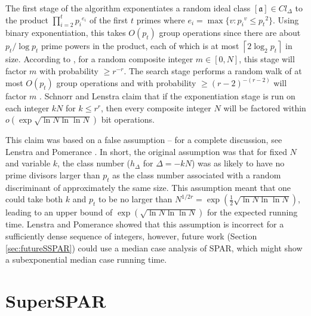\documentclass{ucalgthes1}
\theoremstyle{definition}
\newcommand{\ceil}[1]{\left\lceil #1 \right\rceil}
\newcommand{\ideal}{\mathfrak}
\newcommand{\idealclass}[1]{\left[ \ideal #1 \right]}
\newcommand{\aclass}{\idealclass a}
\begin{document}
The first stage of the algorithm exponentiates a random ideal class $\aclass \in Cl_\Delta$ to the product $\prod_{i=2}^t {p_i}^{e_i}$ of the first $t$ primes where $e_i = \max \{ v : {p_i}^v \le {p_t}^2 \}$.  Using binary exponentiation, this takes $O(p_t)$ group operations since there are about $p_t / \log p_t$ prime powers in the product, each of which is at most $\ceil{2 \log_2 p_t}$ in size. According to \cite[p.290]{Schnorr1984}, for a random composite integer $m \in [0, N]$, this stage will factor $m$ with probability $\ge r^{-r}$.  The search stage performs a random walk of at most $O(p_t)$ group operations and with probability $\ge (r-2)^{-(r-2)}$ will factor $m$ \cite[p.290]{Schnorr1984}.  Schnorr and Lenstra \cite[p.290]{Schnorr1984} claim that if the exponentiation stage is run on each integer $kN$ for $k \le r^r$, then every composite integer $N$ will be factored within $o\left(\exp \sqrt{ \ln N \ln\ln N } \right)$ bit operations.

This claim was based on a false assumption -- for a complete discussion, see Lenstra and Pomerance \cite[\S~11]{Lenstra1992}.  In short, the original assumption was that for fixed $N$ and variable $k$, the class number ($h_\Delta$ for $\Delta = -kN$) was as likely to have no prime divisors larger than $p_t$ as the class number associated with a random discriminant of approximately the same size.  This assumption meant that one could take both $k$ and $p_t$ to be no larger than $N^{1/2r} = \exp\left(\frac{1}{2}\sqrt{\ln N \ln \ln N}\right)$, leading to an upper bound of $\exp\left(\sqrt{\ln N \ln \ln N}\right)$ for the expected running time.  Lenstra and Pomerance showed \cite[\S 11]{Lenstra1992} that this assumption is incorrect for a sufficiently dense sequence of integers, however, future work (Section \ref{sec:futureSSPAR}) could use a median case analysis of SPAR, which might show a subexponential median case running time.


\section{SuperSPAR}
\label{sec:superSpar}
\end{document}
